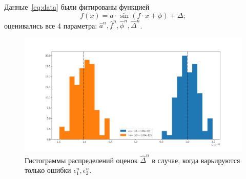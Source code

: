 \documentclass[12pt]{report}
\newcommand{\ntrl}{n}
\begin{document}
Данные~\eqref{eq:data} были фитированы функцией 
\begin{equation}\label{eq:fit_func}
	f(x) = a\cdot\sin(f\cdot x + \phi) + \Delta;
\end{equation}
оценивались все 4 параметра: $\hat{a}^{\ntrl},\hat{f}^{\ntrl},\hat{\phi}^{\ntrl},\hat{\Delta}^{\ntrl}$.

\begin{figure}[h]\centering
	\includegraphics[width=\linewidth]{../../img/Koop/CO_offset_b1_b2_hist_vary_epsilons}
	\caption{Гистограммы распределений оценок $\hat{\Delta}^{\ntrl}$ в случае, когда варьируются только ошибки $\epsilon_1^{\ntrl},\epsilon_2^{\ntrl}$. \label{fig:vary_only_epsilons}}
\end{figure}
\end{document}
